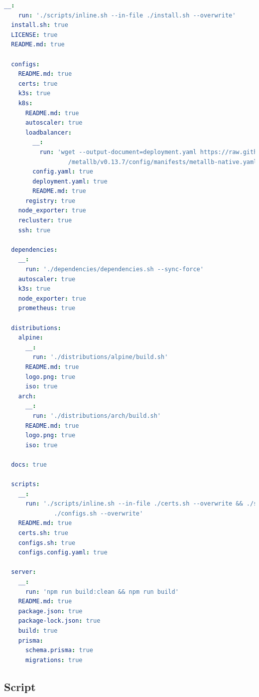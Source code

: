 \begin{lstlisting}[language=yaml, alsoletter={._-}, morekeywords={[2]{__, run, install.sh, LICENSE, README.md, configs, certs, k3s, k8s, autoscaler, loadbalancer, config.yaml, deployment.yaml, registry, node_exporter, recluster, ssh, dependencies, prometheus, distributions, alpine, arch, logo.png, iso, docs, scripts, certs.sh, configs.sh, configs.config.yaml, server, package.json, package-lock.json, build, prisma, schema.prisma, migrations}}, xleftmargin=\parindent, label={lst:bundle_config}, caption=Content of bundle configuration file]
  __:
    run: './scripts/inline.sh --in-file ./install.sh --overwrite'
  install.sh: true
  LICENSE: true
  README.md: true

  configs:
    README.md: true
    certs: true
    k3s: true
    k8s:
      README.md: true
      autoscaler: true
      loadbalancer:
        __:
          run: 'wget --output-document=deployment.yaml https://raw.githubusercontent.com/metallb
                  /metallb/v0.13.7/config/manifests/metallb-native.yaml'
        config.yaml: true
        deployment.yaml: true
        README.md: true
      registry: true
    node_exporter: true
    recluster: true
    ssh: true

  dependencies:
    __:
      run: './dependencies/dependencies.sh --sync-force'
    autoscaler: true
    k3s: true
    node_exporter: true
    prometheus: true

  distributions:
    alpine:
      __:
        run: './distributions/alpine/build.sh'
      README.md: true
      logo.png: true
      iso: true
    arch:
      __:
        run: './distributions/arch/build.sh'
      README.md: true
      logo.png: true
      iso: true

  docs: true

  scripts:
    __:
      run: './scripts/inline.sh --in-file ./certs.sh --overwrite && ./scripts/inline.sh --in-file
              ./configs.sh --overwrite'
    README.md: true
    certs.sh: true
    configs.sh: true
    configs.config.yaml: true

  server:
    __:
      run: 'npm run build:clean && npm run build'
    README.md: true
    package.json: true
    package-lock.json: true
    build: true
    prisma:
      schema.prisma: true
      migrations: true
\end{lstlisting}

\subsection{Script}
\label{subsec:good_practices_bundle_script}


